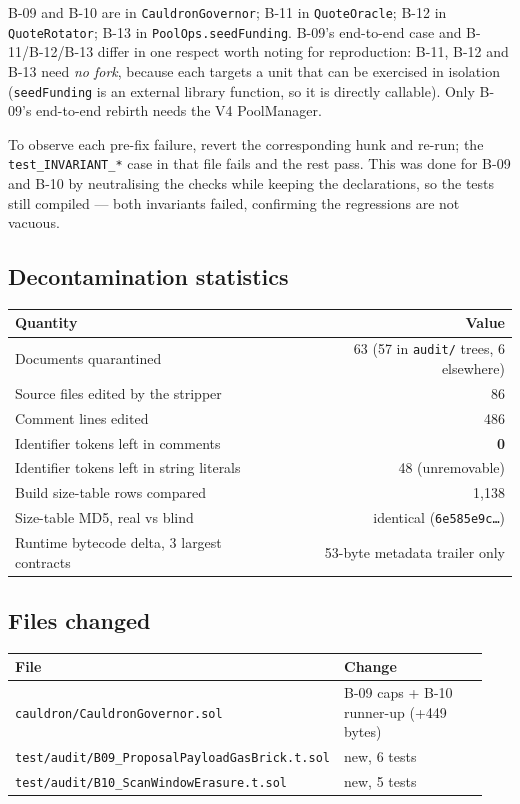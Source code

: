 \documentclass[11pt,a4paper]{article}
\newcommand{\code}[1]{\texttt{\small #1}}
\newcommand{\fileref}[1]{\texttt{\scriptsize #1}}
\begin{document}
\noindent B-09 and B-10 are in \code{CauldronGovernor}; B-11 in \code{QuoteOracle};
B-12 in \code{QuoteRotator}; B-13 in \code{PoolOps.seedFunding}. B-09's end-to-end case
and B-11/B-12/B-13 differ in one respect worth noting for reproduction: B-11, B-12 and
B-13 need \emph{no fork}, because each targets a unit that can be exercised in isolation
(\code{seedFunding} is an external library function, so it is directly callable). Only
B-09's end-to-end rebirth needs the V4 PoolManager.

\noindent To observe each pre-fix failure, revert the corresponding hunk and re-run; the
\code{test\_INVARIANT\_*} case in that file fails and the rest pass. This was done for
B-09 and B-10 by neutralising the checks while keeping the declarations, so the tests
still compiled --- both invariants failed, confirming the regressions are not vacuous.

\subsection{Decontamination statistics}

\begin{center}
\begin{tabular}{@{}lr@{}}
\toprule
\textbf{Quantity} & \textbf{Value} \\
\midrule
Documents quarantined & 63 (57 in \code{audit/} trees, 6 elsewhere) \\
Source files edited by the stripper & 86 \\
Comment lines edited & 486 \\
Identifier tokens left in comments & \textbf{0} \\
Identifier tokens left in string literals & 48 (unremovable) \\
Build size-table rows compared & 1{,}138 \\
Size-table MD5, real vs blind & identical (\code{6e585e9c\ldots}) \\
Runtime bytecode delta, 3 largest contracts & 53-byte metadata trailer only \\
\bottomrule
\end{tabular}
\end{center}

\subsection{Files changed}

\begin{longtable}{@{}p{0.52\linewidth}p{0.42\linewidth}@{}}
\toprule
\textbf{File} & \textbf{Change} \\
\midrule
\endhead
\fileref{cauldron/CauldronGovernor.sol} & B-09 caps + B-10 runner-up (+449 bytes) \\
\fileref{test/audit/B09\_ProposalPayloadGasBrick.t.sol} & new, 6 tests \\
\fileref{test/audit/B10\_ScanWindowErasure.t.sol} & new, 5 tests \\
\bottomrule
\end{longtable}
\end{document}
